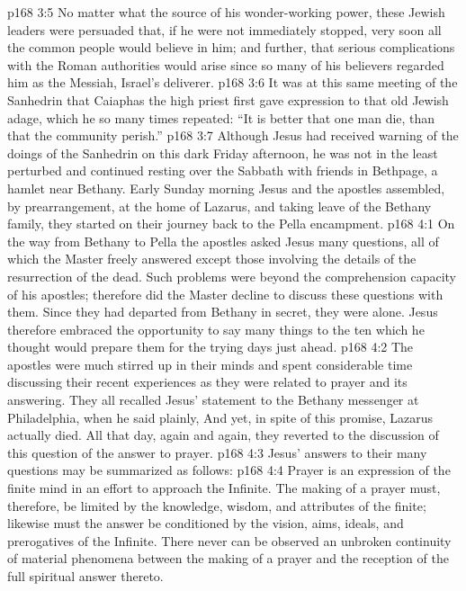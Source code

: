 \vs p168 3:5 No matter what the source of his wonder\hyp{}working power, these Jewish leaders were persuaded that, if he were not immediately stopped, very soon all the common people would believe in him; and further, that serious complications with the Roman authorities would arise since so many of his believers regarded him as the Messiah, Israel’s deliverer.
\vs p168 3:6 It was at this same meeting of the Sanhedrin that Caiaphas the high priest first gave expression to that old Jewish adage, which he so many times repeated: “It is better that one man die, than that the community perish.”
\vs p168 3:7 Although Jesus had received warning of the doings of the Sanhedrin on this dark Friday afternoon, he was not in the least perturbed and continued resting over the Sabbath with friends in Bethpage, a hamlet near Bethany. Early Sunday morning Jesus and the apostles assembled, by prearrangement, at the home of Lazarus, and taking leave of the Bethany family, they started on their journey back to the Pella encampment.
\vs p168 4:1 On the way from Bethany to Pella the apostles asked Jesus many questions, all of which the Master freely answered except those involving the details of the resurrection of the dead. Such problems were beyond the comprehension capacity of his apostles; therefore did the Master decline to discuss these questions with them. Since they had departed from Bethany in secret, they were alone. Jesus therefore embraced the opportunity to say many things to the ten which he thought would prepare them for the trying days just ahead.
\vs p168 4:2 The apostles were much stirred up in their minds and spent considerable time discussing their recent experiences as they were related to prayer and its answering. They all recalled Jesus’ statement to the Bethany messenger at Philadelphia, when he said plainly,  And yet, in spite of this promise, Lazarus actually died. All that day, again and again, they reverted to the discussion of this question of the answer to prayer.
\vs p168 4:3 Jesus’ answers to their many questions may be summarized as follows:
\vs p168 4:4 \bibnobreakspace Prayer is an expression of the finite mind in an effort to approach the Infinite. The making of a prayer must, therefore, be limited by the knowledge, wisdom, and attributes of the finite; likewise must the answer be conditioned by the vision, aims, ideals, and prerogatives of the Infinite. There never can be observed an unbroken continuity of material phenomena between the making of a prayer and the reception of the full spiritual answer thereto.
